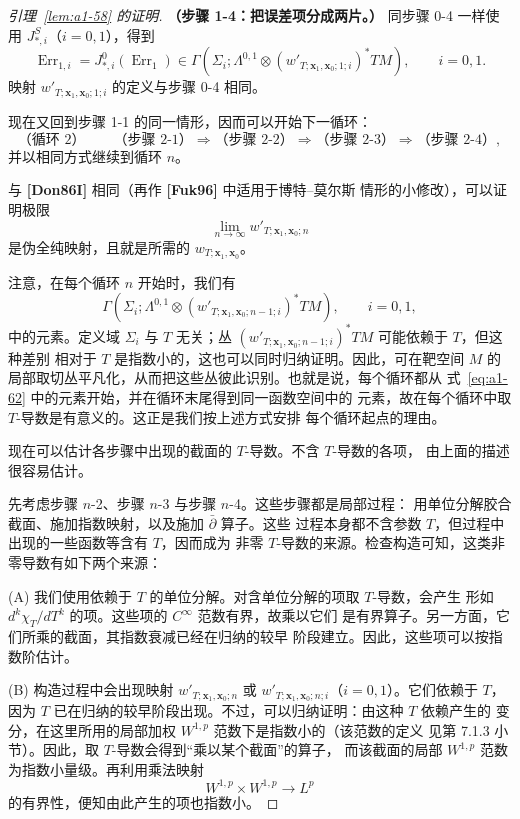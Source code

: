 \begin{proof}[引理~\ref{lem:a1-58} 的证明]
\smallskip\noindent\textbf{（步骤 1-4：把误差项分成两片。）}
同步骤 0-4 一样使用 $J^S_{*,i}$（$i=0,1$），得到
\[
 \operatorname{Err}_{1,i}
 =J^0_{*,i}(\operatorname{Err}_1)
 \in
 \Gamma\!\left(
 \Sigma_i;\Lambda^{0,1}\otimes
 (w'_{T;\mathbf x_1,\mathbf x_0;1;i})^*TM
 \right),
 \qquad i=0,1.
\]
映射 $w'_{T;\mathbf x_1,\mathbf x_0;1;i}$ 的定义与步骤 0-4 相同。

现在又回到步骤 1-1 的同一情形，因而可以开始下一循环：
\[
 \text{（循环 2）}\qquad
 \text{（步骤 2-1）}\Longrightarrow
 \text{（步骤 2-2）}\Longrightarrow
 \text{（步骤 2-3）}\Longrightarrow
 \text{（步骤 2-4）},
\]
并以相同方式继续到循环 $n$。

与 \textbf{[Don86I]} 相同（再作 \textbf{[Fuk96]} 中适用于博特--莫尔斯
情形的小修改），可以证明极限
\[
 \lim_{n\to\infty}w'_{T;\mathbf x_1,\mathbf x_0;n}
\]
是伪全纯映射，且就是所需的
$w_{T;\mathbf x_1,\mathbf x_0}$。

注意，在每个循环 $n$ 开始时，我们有
\begin{equation}
 \Gamma\!\left(
 \Sigma_i;\Lambda^{0,1}\otimes
 (w'_{T;\mathbf x_1,\mathbf x_0;n-1;i})^*TM
 \right),
 \qquad i=0,1,
\tag{A1.62}\label{eq:a1-62}
\end{equation}
中的元素。定义域 $\Sigma_i$ 与 $T$ 无关；丛
$(w'_{T;\mathbf x_1,\mathbf x_0;n-1;i})^*TM$ 可能依赖于 $T$，但这种差别
相对于 $T$ 是指数小的，这也可以同时归纳证明。因此，可在靶空间 $M$
的局部取切丛平凡化，从而把这些丛彼此识别。也就是说，每个循环都从
式~\eqref{eq:a1-62} 中的元素开始，并在循环末尾得到同一函数空间中的
元素，故在每个循环中取 $T$-导数是有意义的。这正是我们按上述方式安排
每个循环起点的理由。

现在可以估计各步骤中出现的截面的 $T$-导数。不含 $T$-导数的各项，
由上面的描述很容易估计。

先考虑步骤 $n$-2、步骤 $n$-3 与步骤 $n$-4。这些步骤都是局部过程：
用单位分解胶合截面、施加指数映射，以及施加 $\bar\partial$ 算子。这些
过程本身都不含参数 $T$，但过程中出现的一些函数等含有 $T$，因而成为
非零 $T$-导数的来源。检查构造可知，这类非零导数有如下两个来源：

\smallskip\noindent\textup{(A)}
我们使用依赖于 $T$ 的单位分解。对含单位分解的项取 $T$-导数，会产生
形如 $d^k\chi_T/dT^k$ 的项。这些项的 $C^\infty$ 范数有界，故乘以它们
是有界算子。另一方面，它们所乘的截面，其指数衰减已经在归纳的较早
阶段建立。因此，这些项可以按指数阶估计。

\smallskip\noindent\textup{(B)}
构造过程中会出现映射
$w'_{T;\mathbf x_1,\mathbf x_0;n}$ 或
$w'_{T;\mathbf x_1,\mathbf x_0;n;i}$（$i=0,1$）。它们依赖于 $T$，因为
$T$ 已在归纳的较早阶段出现。不过，可以归纳证明：由这种 $T$ 依赖产生的
变分，在这里所用的局部加权 $W^{1,p}$ 范数下是指数小的（该范数的定义
见第 7.1.3 小节）。因此，取 $T$-导数会得到“乘以某个截面”的算子，
而该截面的局部 $W^{1,p}$ 范数为指数小量级。再利用乘法映射
\[
 W^{1,p}\times W^{1,p}\longrightarrow L^p
\]
的有界性，便知由此产生的项也指数小。


\end{proof}
